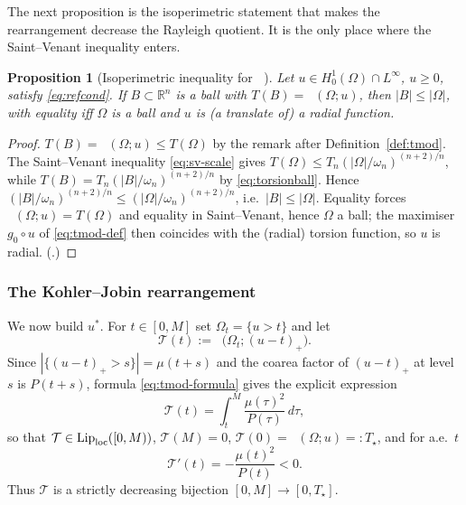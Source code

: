 \documentclass[11pt]{amsart}
\newtheorem{proposition}[theorem]{Proposition}
\theoremstyle{definition}
\newcommand{\R}{\mathbb R}
\newcommand{\Om}{\Omega}
\newcommand{\abs}[1]{\left|#1\right|}
\DeclareMathOperator{\Tmod}{T_{\mathrm{mod}}}
\begin{document}
The next proposition is the isoperimetric statement that makes the
rearrangement decrease the Rayleigh quotient. It is the only place where
the Saint--Venant inequality enters.

\begin{proposition}[Isoperimetric inequality for $\Tmod$]\label{prop:isop-tmod}
Let $u\in H^1_0(\Om)\cap L^\infty$, $u\ge0$, satisfy \eqref{eq:refcond}.
If $B\subset\R^n$ is a ball with $T(B)=\Tmod(\Om;u)$, then $\abs B\le\abs\Om$,
with equality iff $\Om$ is a ball and $u$ is (a translate of) a radial
function.
\end{proposition}

\begin{proof}
$T(B)=\Tmod(\Om;u)\le T(\Om)$ by the remark after
Definition~\ref{def:tmod}. The Saint--Venant inequality \eqref{eq:sv-scale}
gives $T(\Om)\le T_n(\abs\Om/\omega_n)^{(n+2)/n}$, while
$T(B)=T_n(\abs B/\omega_n)^{(n+2)/n}$ by \eqref{eq:torsionball}. Hence
$(\abs B/\omega_n)^{(n+2)/n}\le(\abs\Om/\omega_n)^{(n+2)/n}$, i.e.\
$\abs B\le\abs\Om$. Equality forces $\Tmod(\Om;u)=T(\Om)$ and equality in
Saint--Venant, hence $\Om$ a ball; the maximiser $g_0\circ u$ of
\eqref{eq:tmod-def} then coincides with the (radial) torsion function, so
$u$ is radial. (\cite[Prop.~3.8]{Brasco2014}.)
\end{proof}

\subsubsection*{The Kohler--Jobin rearrangement}

We now build $u^*$. For $t\in[0,M]$ set $\Om_t=\{u>t\}$ and let
\begin{equation}\label{eq:Tt}
  \mathcal T(t):=\Tmod\bigl(\Om_t;(u-t)_+\bigr).
\end{equation}
Since $\abs{\{(u-t)_+>s\}}=\mu(t+s)$ and the coarea factor of $(u-t)_+$ at
level $s$ is $P(t+s)$, formula \eqref{eq:tmod-formula} gives the explicit
expression
\begin{equation}\label{eq:Tt-formula}
  \mathcal T(t)=\int_t^M\frac{\mu(\tau)^2}{P(\tau)}\,d\tau,
\end{equation}
so that $\mathcal T\in\mathrm{Lip}_{\rm loc}([0,M))$, $\mathcal T(M)=0$,
$\mathcal T(0)=\Tmod(\Om;u)=:T_\star$, and for a.e.\ $t$
\begin{equation}\label{eq:Tprime}
  \mathcal T'(t)=-\frac{\mu(t)^2}{P(t)}<0 .
\end{equation}
Thus $\mathcal T$ is a strictly decreasing bijection $[0,M]\to[0,T_\star]$.
\end{document}
